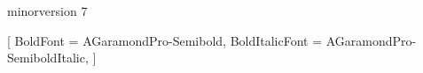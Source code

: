 %
%   
%   

\ifdefined\pdfvariable\pdfvariable minorversion 7\fi

\usepackage{fontspec}
\setmainfont{EB Garamond}[
  BoldFont       = AGaramondPro-Semibold,
  BoldItalicFont = AGaramondPro-SemiboldItalic,
]

\newcommand{\arab}[1]{{\arabicfont\textdir TRT #1}}
\newcommand{\cjk}[1]{{\cjkfont #1}}
\newcommand{\shouting}[1]{\textbf{\textsc{#1}}}
\usepackage[russian,french]{babel}
\usepackage[program=/usr/local/bin/lilypond,includepaths={music}]{lyluatex}
\usepackage{microtype}
\usepackage{fmtcount}
\usepackage{catchfile}
\usepackage{graphicx}
\usepackage{xcolor}
\usepackage{amsmath}
\usepackage{xparse}
\usepackage{tikz}
\usepackage{afterpage}
\usepackage{needspace}
\usepackage{pdfpages}
\usepackage[absolute,overlay]{textpos}
\usepackage{tabularx}
\usepackage{booktabs}
\usepackage{calc}
\usepackage{wrapfig}
\usepackage{tcolorbox}
\usepackage{ragged2e}
\makeatletter
\let\WF@@orig@finale\WF@finale
\def\WF@finale{\WF@@orig@finale\global\linewidth\textwidth\global\@totalleftmargin\z@}
\makeatother
\pretocmd{\chapter}{\WFclear}{}{}
\usepackage{hyperref}
\usepackage{bookmark}
\hypersetup{pdfpagelayout=TwoPageRight, hidelinks}
\usetikzlibrary{calc,positioning}


